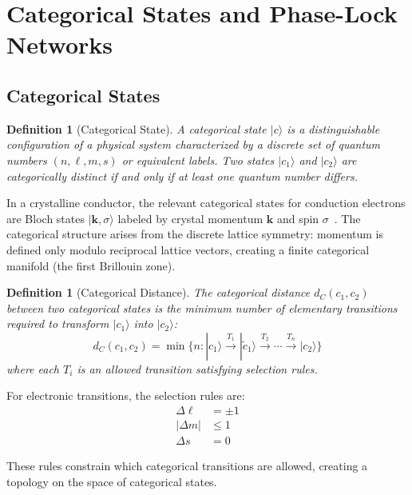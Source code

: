 \documentclass[twocolumn,showpacs,preprintnumbers,amsmath,amssymb,prd]{revtex4-2}
\newtheorem{definition}[theorem]{Definition}
\newcommand{\kvec}{\mathbf{k}}
\begin{document}
\section{Categorical States and Phase-Lock Networks}
\label{sec:categorical}

\subsection{Categorical States}

\begin{definition}[Categorical State]
\label{def:categorical_state}
A categorical state $|c\rangle$ is a distinguishable configuration of a physical system characterized by a discrete set of quantum numbers $(n, \ell, m, s)$ or equivalent labels. Two states $|c_1\rangle$ and $|c_2\rangle$ are categorically distinct if and only if at least one quantum number differs.
\end{definition}

In a crystalline conductor, the relevant categorical states for conduction electrons are Bloch states $|\kvec, \sigma\rangle$ labeled by crystal momentum $\kvec$ and spin $\sigma$~\cite{Ashcroft1976}. The categorical structure arises from the discrete lattice symmetry: momentum is defined only modulo reciprocal lattice vectors, creating a finite categorical manifold (the first Brillouin zone).

\begin{definition}[Categorical Distance]
\label{def:categorical_distance}
The categorical distance $d_C(c_1, c_2)$ between two categorical states is the minimum number of elementary transitions required to transform $|c_1\rangle$ into $|c_2\rangle$:
\begin{equation}
d_C(c_1, c_2) = \min\{n : |c_1\rangle \xrightarrow{T_1} |\tilde{c}_1\rangle \xrightarrow{T_2} \cdots \xrightarrow{T_n} |c_2\rangle\}
\label{eq:categorical_distance}
\end{equation}
where each $T_i$ is an allowed transition satisfying selection rules.
\end{definition}

For electronic transitions, the selection rules are:
\begin{align}
\Delta\ell &= \pm 1 \label{eq:selection_ell}\\
|\Delta m| &\leq 1 \label{eq:selection_m}\\
\Delta s &= 0 \label{eq:selection_s}
\end{align}

These rules constrain which categorical transitions are allowed, creating a topology on the space of categorical states.
\end{document}
